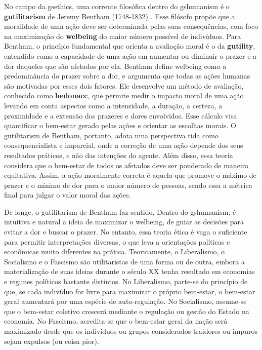 \documentclass[./main.tex]{subfiles}
\begin{document}
\par No campo da \gls{gsethics}, uma corrente filosófica dentro do \gls{gshumanism} é o \textbf{\gls{gutilitarism}} de Jeremy Bentham (1748-1832) \cite{Gordon2002a}. Esse filósofo propõe que a moralidade de uma ação deve ser determinada pelas suas consequências, com foco na maximização do \textbf{\gls{welbeing}} do maior número possível de indivíduos. Para Bentham, o princípio fundamental que orienta a avaliação moral é o da \textbf{\gls{gutility}}, entendido como a capacidade de uma ação em aumentar ou diminuir o prazer e a dor daqueles que são afetados por ela. Bentham define \gls{welbeing} como a predominância do prazer sobre a dor, e argumenta que todas as ações humanas são motivadas por esses dois fatores. Ele desenvolve um método de avaliação, conhecido como \textbf{\gls{hedonacc}}, que permite medir o impacto moral de uma ação levando em conta aspectos como a intensidade, a duração, a certeza, a proximidade e a extensão dos prazeres e dores envolvidos. Esse cálculo visa quantificar o bem-estar gerado pelas ações e orientar as escolhas morais. O \gls{gutilitarism} de Bentham, portanto, adota uma perspectiva tida como consequencialista e imparcial, onde a correção de uma ação depende dos seus resultados práticos, e não das intenções do agente. Além disso, essa \gls{teoria} considera que o bem-estar de todos os afetados deve ser ponderado de maneira equitativa. Assim, a ação moralmente correta é aquela que promove o máximo de prazer e o mínimo de dor para o maior número de pessoas, sendo essa a métrica final para julgar o valor moral das ações. 

\par De longe, o \gls{gutilitarism} de Bentham faz sentido. Dentro do \gls{gshumanism}, é intuitiva e natural a ideia de maximizar o \gls{welbeing}, de guiar as decisões para evitar a dor e buscar o prazer. No entanto, essa \gls{teoria} ética é vaga o suficiente para permitir interpretações diversas, o que leva a orientações políticas e econômicas muito diferentes na prática. Teoricamente, o Liberalismo, o Socialismo e o Fascismo são utilitaristas de uma forma ou de outra, embora a materialização de suas ideias durante o século XX tenha resultado em economias e regimes políticos bastante distintos. No Liberalismo, parte-se do princípio de que, se cada indivíduo for livre para maximizar o próprio bem-estar, o bem-estar geral aumentará por uma espécie de auto-regulação. No Socialismo, assume-se que o bem-estar coletivo crescerá mediante o regulação ou gestão do Estado na economia. No Fascismo, acredita-se que o bem-estar geral da nação será maximizado desde que os indivíduos ou grupos considerados traidores ou impuros sejam expulsos (ou coisa pior). 
\end{document}
